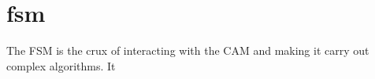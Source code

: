 \section{fsm}
The FSM is the crux of interacting with the CAM and making it carry out complex algorithms. It 